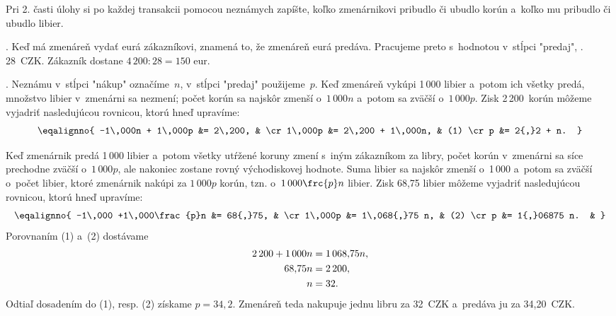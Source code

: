 {%
\napad
Pri 2. časti úlohy si po každej transakcii pomocou neznámych zapíšte, koľko zmenárnikovi
pribudlo či ubudlo korún a~koľko mu pribudlo či ubudlo libier.

.
Keď má zmenáreň vydať eurá zákazníkovi, znamená to, že zmenáreň eurá predáva.
Pracujeme preto s~hodnotou v~stĺpci "predaj", \tj. 28~CZK.
Zákazník dostane $4\,200:28=150$ eur.

.
Neznámu v~stĺpci "nákup" označíme~$n$, v~stĺpci "predaj"
použijeme~$p$.
Keď zmenáreň vykúpi 1\,000 libier a~potom ich všetky predá, množstvo libier
v~zmenárni sa nezmení;
počet korún sa najskôr zmenší o~$1\,000n$ a~potom sa zväčší o~$1\,000p$.
Zisk 2\,200~korún môžeme vyjadriť nasledujúcou rovnicou, ktorú hneď upravíme:
$$
\eqalignno{
-1\,000n + 1\,000p &= 2\,200, & \cr
1\,000p &= 2\,200 + 1\,000n, & (1) \cr p &= 2{,}2 + n. }
$$

Keď zmenárnik predá 1\,000 libier a~potom všetky utŕžené koruny zmení
s~iným zákazníkom za libry, počet korún v~zmenárni sa síce prechodne
zväčší o~$1\,000p$, ale nakoniec zostane rovný východiskovej hodnote.
Suma libier sa najskôr zmenší o~1\,000 a~potom sa zväčší o~počet libier, ktoré
zmenárnik nakúpi za $1\,000p$ korún, tzn. o~$1\,000\frc{p}n$ libier.
Zisk 68{,}75 libier môžeme vyjadriť nasledujúcou rovnicou, ktorú hneď upravíme:
$$
\eqalignno{
-1\,000 +1\,000\frac{p}n &= 68{,}75, & \cr
1\,000p &= 1\,068{,}75 n, & (2) \cr p &= 1{,}06875 n. & }
$$
Porovnaním (1) a~(2) dostávame
$$
\aligned
2\,200 + 1\,000n &=1\,068{,}75 n, \\
68{,}75 n &= 2\,200, \\
n &=32.
\endaligned
$$
Odtiaľ dosadením do (1), resp. (2) získame $p =34{,}2$.
Zmenáreň teda nakupuje jednu libru za 32~CZK a~predáva ju za 34{,}20~CZK.
}

